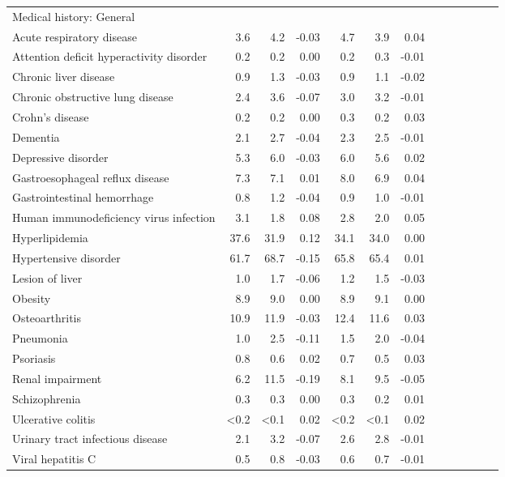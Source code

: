 \documentclass[11pt,]{article}
\begin{document}
\begin{longtable}{lrrrrrrrrrrrr}
  Medical history: General &    &    &     &    &    &     \\ 
      Acute respiratory disease &  3.6 &  4.2 & -0.03 &  4.7 &  3.9 &  0.04 \\ 
      Attention deficit hyperactivity disorder &  0.2 &  0.2 &  0.00 &  0.2 &  0.3 & -0.01 \\ 
      Chronic liver disease &  0.9 &  1.3 & -0.03 &  0.9 &  1.1 & -0.02 \\ 
      Chronic obstructive lung disease &  2.4 &  3.6 & -0.07 &  3.0 &  3.2 & -0.01 \\ 
      Crohn's disease &  0.2 &  0.2 &  0.00 &  0.3 &  0.2 &  0.03 \\ 
      Dementia &  2.1 &  2.7 & -0.04 &  2.3 &  2.5 & -0.01 \\ 
      Depressive disorder &  5.3 &  6.0 & -0.03 &  6.0 &  5.6 &  0.02 \\ 
      Gastroesophageal reflux disease &  7.3 &  7.1 &  0.01 &  8.0 &  6.9 &  0.04 \\ 
      Gastrointestinal hemorrhage &  0.8 &  1.2 & -0.04 &  0.9 &  1.0 & -0.01 \\ 
      Human immunodeficiency virus infection &  3.1 &  1.8 &  0.08 &  2.8 &  2.0 &  0.05 \\ 
      Hyperlipidemia & 37.6 & 31.9 &  0.12 & 34.1 & 34.0 &  0.00 \\ 
      Hypertensive disorder & 61.7 & 68.7 & -0.15 & 65.8 & 65.4 &  0.01 \\ 
      Lesion of liver &  1.0 &  1.7 & -0.06 &  1.2 &  1.5 & -0.03 \\ 
      Obesity &  8.9 &  9.0 &  0.00 &  8.9 &  9.1 &  0.00 \\ 
      Osteoarthritis & 10.9 & 11.9 & -0.03 & 12.4 & 11.6 &  0.03 \\ 
      Pneumonia &  1.0 &  2.5 & -0.11 &  1.5 &  2.0 & -0.04 \\ 
      Psoriasis &  0.8 &  0.6 &  0.02 &  0.7 &  0.5 &  0.03 \\ 
      Renal impairment &  6.2 & 11.5 & -0.19 &  8.1 &  9.5 & -0.05 \\ 
      Schizophrenia &  0.3 &  0.3 &  0.00 &  0.3 &  0.2 &  0.01 \\ 
      Ulcerative colitis & <0.2 & <0.1 &  0.02 & <0.2 & <0.1 &  0.02 \\ 
      Urinary tract infectious disease &  2.1 &  3.2 & -0.07 &  2.6 &  2.8 & -0.01 \\ 
      Viral hepatitis C &  0.5 &  0.8 & -0.03 &  0.6 &  0.7 & -0.01 \\ 

\end{longtable}
\end{document}
